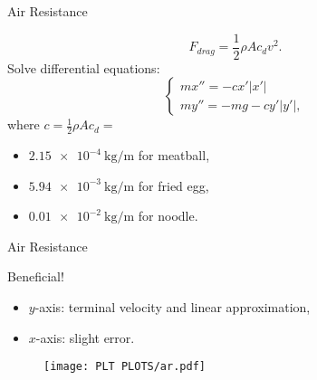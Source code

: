 \documentclass[compress,12pt,mp]{beamer}
\begin{document}
\begin{frame}[t]{Air Resistance}

\begin{equation*}
    F_{drag}=\frac{1}{2}\rho A c_d v^2.
\end{equation*}
Solve differential equations:
$$
\begin{cases}
        mx''=-cx'|x'|\\
        my''=-mg-cy'|y'|,
\end{cases}
$$
where $c=\frac{1}{2}\rho A c_d=$
\begin{itemize}
    \item $\SI[per-mode=symbol]{2.15e-4}{\kg\per\m}$ for meatball,
    \item $\SI[per-mode=symbol]{5.94e-3}{\kg\per\m}$ for fried egg,
    \item $\SI[per-mode=symbol]{0.01e-2}{\kg\per\m}$ for noodle.

\end{itemize}


\end{frame}
\begin{frame}[t]{Air Resistance}

Beneficial!
\begin{itemize}
    \item $y$-axis: terminal velocity and linear approximation,
    \item $x$-axis: slight error.
\end{itemize}
    \begin{figure}
  \centering
  \texttt{[image: PLT PLOTS/ar.pdf]}
\end{figure}
\end{frame}
\end{document}

